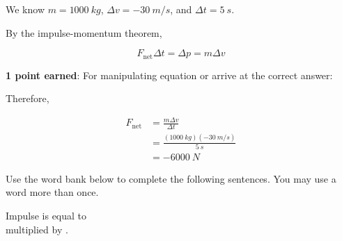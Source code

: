 \documentclass[answers]{exam}
\begin{document}
\begin{questions}
\begin{solutionorbox}[6cm]
We know $m = \SI{1000}{kg}$, $\Delta v = \SI{-30}{m/s}$, and $\Delta t = \SI{5}{s}$. \medskip


By the impulse-momentum theorem,

\begin{equation*}
    F_\mathrm{net} \Delta t = \Delta p = m \Delta v
\end{equation*}

\textbf{\color{red} 1 point earned}: For manipulating equation or arrive at the correct answer:

Therefore,

\vspace{-1em}
\begin{align*}
    F_\mathrm{net} &= \frac{m \Delta v}{\Delta t} \\[1ex]
    &= \frac{(\SI{1000}{kg})(-\SI{30}{m/s})}{\SI{5}{s}} \\[1ex]
    &= \boxed{\SI{-6000}{N}}
\end{align*}
\end{solutionorbox}


\question[2]
Use the word bank below to complete the following sentences. You may use a word more than once.
\vspace{-1ex}

\begin{center}
\begin{minipage}{0.6\textwidth}
\large
\centering
    Impulse is equal to \\[1ex] \fillin[force][3cm] multiplied by \fillin[time][3cm].

    \vspace{1.5em}
    

\end{minipage}
\end{center}
\end{questions}
\end{document}
